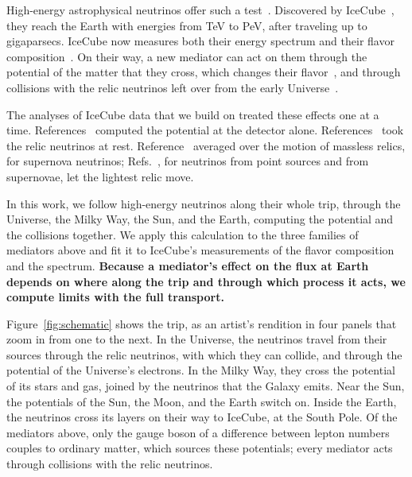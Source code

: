 \documentclass[linenumbers, aps, prd, twocolumn, superscriptaddress, floatfix, longbibliography, nofootinbib, bibnotes]{revtex4-2}
\begin{document}
High-energy astrophysical neutrinos offer such a test~\cite{Ackermann:2022rqc, Arguelles:2022tki}.
Discovered by IceCube~\cite{IceCube:2013low}, they reach the Earth with energies from TeV to PeV, after traveling up to gigaparsecs.
IceCube now measures both their energy spectrum and their flavor composition~\cite{IceCube:2025tgp, IceCube:2025ewu, IceCube:2025ole}.
On their way, a new mediator can act on them through the potential of the matter that they cross, which changes their flavor~\cite{Bustamante:2018mzu, Agarwalla:2023sng}, and through collisions with the relic neutrinos left over from the early Universe~\cite{Ng:2014pca, Ioka:2014kca}.

The analyses of IceCube data that we build on treated these effects one at a time.
References~\cite{Bustamante:2018mzu, Agarwalla:2023sng} computed the potential at the detector alone.
References~\cite{Ng:2014pca, Ioka:2014kca, Bustamante:2020mep, Esteban:2021tub} took the relic neutrinos at rest.
Reference~\cite{Kolb:1987qy} averaged over the motion of massless relics, for supernova neutrinos; Refs.~\cite{Doring:2023vmk, Wang:2025qap}, for neutrinos from point sources and from supernovae, let the lightest relic move.

In this work, we follow high-energy neutrinos along their whole trip, through the Universe, the Milky Way, the Sun, and the Earth, computing the potential and the collisions together.
We apply this calculation to the three families of mediators above and fit it to IceCube's measurements of the flavor composition and the spectrum.
\textbf{Because a mediator's effect on the flux at Earth depends on where along the trip and through which process it acts, we compute limits with the full transport.}

Figure~\ref{fig:schematic} shows the trip, as an artist's rendition in four panels that zoom in from one to the next.
In the Universe, the neutrinos travel from their sources through the relic neutrinos, with which they can collide, and through the potential of the Universe's electrons.
In the Milky Way, they cross the potential of its stars and gas, joined by the neutrinos that the Galaxy emits.
Near the Sun, the potentials of the Sun, the Moon, and the Earth switch on.
Inside the Earth, the neutrinos cross its layers on their way to IceCube, at the South Pole.
Of the mediators above, only the gauge boson of a difference between lepton numbers couples to ordinary matter, which sources these potentials; every mediator acts through collisions with the relic neutrinos.
\end{document}
